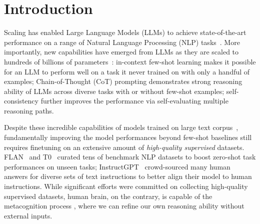 \section{Introduction}

Scaling has enabled Large Language Models (LLMs) to achieve state-of-the-art performance on a range of Natural Language Processing (NLP) tasks~\citep{Wang2018GLUEAM, Wang2019SuperGLUEAS, Rajpurkar2016SQuAD1Q}. More importantly, new capabilities have emerged from LLMs as they are scaled to hundreds of billions of parameters~\citep{wei2022emergent}: in-context few-shot learning \citep{Brown2020LanguageMA} makes it possible for an LLM to perform well on a task it never trained on with only a handful of examples; Chain-of-Thought (CoT) prompting \citep{Wei2022ChainOT, step_by_step} demonstrates strong reasoning ability of LLMs across diverse tasks with or without few-shot examples; self-consistency \citep{Wang2022SelfConsistencyIC} further improves the performance via self-evaluating multiple reasoning paths.

Despite these incredible capabilities of models trained on large text corpus~\citep{Brown2020LanguageMA,Chowdhery2022PaLMSL}, fundamentally improving the model performances beyond few-shot baselines still requires finetuning on an extensive amount of \textit{high-quality supervised} datasets. FLAN~\citep{wei2021finetuned,chung2022scaling} and T0~\citep{sanh2021multitask} curated tens of benchmark NLP datasets to boost zero-shot task performances on unseen tasks; InstructGPT~\citep{ouyang2022training} crowd-sourced many human answers for diverse sets of text instructions to better align their model to human instructions. %
While significant efforts were committed on collecting high-quality supervised datasets, human brain, on the contrary, is capable of the metacognition process \citep{dunlosky2008metacognition}, where we can refine our own reasoning ability without external inputs. %

